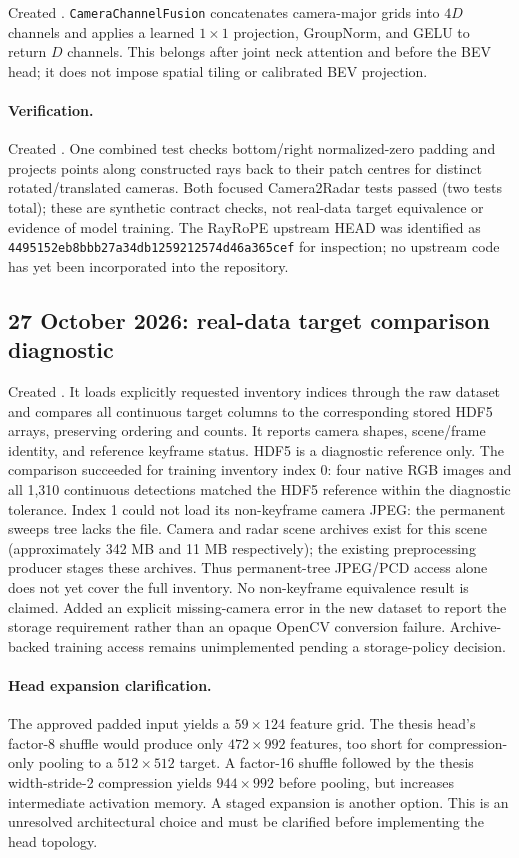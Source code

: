 \documentclass[11pt,a4paper]{article}
\begin{document}
Created . \texttt{CameraChannelFusion} concatenates camera-major grids into $4D$ channels and applies a learned $1\times1$ projection, GroupNorm, and GELU to return $D$ channels. This belongs after joint neck attention and before the BEV head; it does not impose spatial tiling or calibrated BEV projection.

\paragraph{Verification.}
Created . One combined test checks bottom/right normalized-zero padding and projects points along constructed rays back to their patch centres for distinct rotated/translated cameras. Both focused Camera2Radar tests passed (two tests total); these are synthetic contract checks, not real-data target equivalence or evidence of model training. The RayRoPE upstream HEAD was identified as \texttt{4495152eb8bbb27a34db1259212574d46a365cef} for inspection; no upstream code has yet been incorporated into the repository.

\subsection{27 October 2026: real-data target comparison diagnostic}
Created . It loads explicitly requested inventory indices through the raw dataset and compares all continuous target columns to the corresponding stored HDF5 arrays, preserving ordering and counts. It reports camera shapes, scene/frame identity, and reference keyframe status. HDF5 is a diagnostic reference only. The comparison succeeded for training inventory index 0: four native RGB images and all 1,310 continuous detections matched the HDF5 reference within the diagnostic tolerance. Index 1 could not load its non-keyframe camera JPEG: the permanent sweeps tree lacks the file. Camera and radar scene archives exist for this scene (approximately 342 MB and 11 MB respectively); the existing preprocessing producer stages these archives. Thus permanent-tree JPEG/PCD access alone does not yet cover the full inventory. No non-keyframe equivalence result is claimed. Added an explicit missing-camera error in the new dataset to report the storage requirement rather than an opaque OpenCV conversion failure. Archive-backed training access remains unimplemented pending a storage-policy decision.

\paragraph{Head expansion clarification.}
The approved padded input yields a $59\times124$ feature grid. The thesis head's factor-8 shuffle would produce only $472\times992$ features, too short for compression-only pooling to a $512\times512$ target. A factor-16 shuffle followed by the thesis width-stride-2 compression yields $944\times992$ before pooling, but increases intermediate activation memory. A staged expansion is another option. This is an unresolved architectural choice and must be clarified before implementing the head topology.
\end{document}
